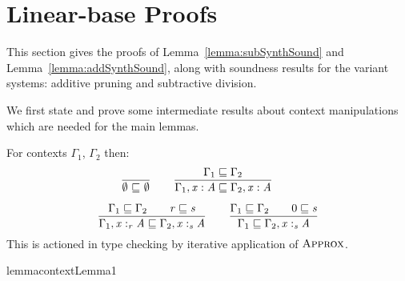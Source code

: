 \section{Linear-base Proofs}
\label{sec:linear-proofs}
This section gives the proofs of Lemma~\ref{lemma:subSynthSound} and
Lemma~\ref{lemma:addSynthSound}, along with soundness results for the
variant systems: additive pruning and subtractive division.

We first state and prove some intermediate results about context manipulations
which are needed for the main lemmas.

\begin{definition}
For contexts $\Gamma_{{\mathrm{1}}}$, $\Gamma_{{\mathrm{2}}}$ then:
%
\begin{align*}
\begin{array}{c}
\dfrac{}{\emptyset  \  \textcolor{coeffectColor}{\sqsubseteq} \   \emptyset}
\qquad
\dfrac{\Gamma_{{\mathrm{1}}} \sqsubseteq \Gamma_{{\mathrm{2}}}}
      {\Gamma_{{\mathrm{1}}}  \GRANULEsym{,}   \GRANULEmv{x}  :  \GRANULEnt{A} \sqsubseteq \Gamma_{{\mathrm{2}}}  \GRANULEsym{,}   \GRANULEmv{x}  :  \GRANULEnt{A}}
\qquad \\[1.5em]
\dfrac{\Gamma_{{\mathrm{1}}} \sqsubseteq \Gamma_{{\mathrm{2}}} \qquad \GRANULEnt{r} \sqsubseteq \GRANULEnt{s}}
      {\Gamma_{{\mathrm{1}}}  \GRANULEsym{,}   \GRANULEmv{x}  :_{\textcolor{coeffectColor}{  \GRANULEnt{r}  } }   \GRANULEnt{A} \sqsubseteq \Gamma_{{\mathrm{2}}}  \GRANULEsym{,}   \GRANULEmv{x}  :_{\textcolor{coeffectColor}{  \GRANULEnt{s}  } }   \GRANULEnt{A}}
\qquad
\dfrac{ \Gamma_{{\mathrm{1}}} \sqsubseteq \Gamma_{{\mathrm{2}}} \qquad 0 \sqsubseteq \GRANULEnt{s}}
      { \Gamma_{{\mathrm{1}}} \sqsubseteq \Gamma_{{\mathrm{2}}}  \GRANULEsym{,}   \GRANULEmv{x}  :_{\textcolor{coeffectColor}{  \GRANULEnt{s}  } }   \GRANULEnt{A}}
\end{array}
\end{align*}
%
This is actioned in type checking by iterative application of $\textsc{Approx}$.
\end{definition}

\begin{restatable}{lemma}{contextLemma1}
  \label{lemma:contextLemma1}
\end{restatable}

